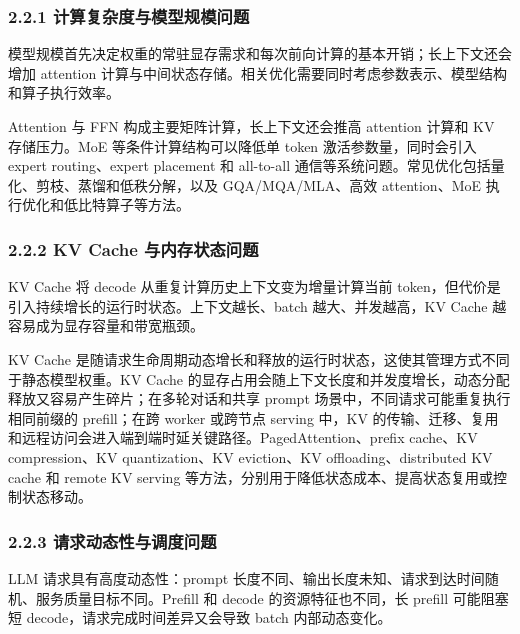 \subsubsection*{2.2.1 计算复杂度与模型规模问题}

模型规模首先决定权重的常驻显存需求和每次前向计算的基本开销；长上下文还会增加 attention 计算与中间状态存储。相关优化需要同时考虑参数表示、模型结构和算子执行效率。

Attention 与 FFN 构成主要矩阵计算，长上下文还会推高 attention 计算和 KV 存储压力。MoE 等条件计算结构可以降低单 token 激活参数量，同时会引入 expert routing、expert placement 和 all-to-all 通信等系统问题。常见优化包括量化、剪枝、蒸馏和低秩分解，以及 GQA/MQA/MLA、高效 attention、MoE 执行优化和低比特算子等方法。




\subsubsection*{2.2.2 KV Cache 与内存状态问题}

KV Cache 将 decode 从重复计算历史上下文变为增量计算当前 token，但代价是引入持续增长的运行时状态。上下文越长、batch 越大、并发越高，KV Cache 越容易成为显存容量和带宽瓶颈。

KV Cache 是随请求生命周期动态增长和释放的运行时状态，这使其管理方式不同于静态模型权重。KV Cache 的显存占用会随上下文长度和并发度增长，动态分配释放又容易产生碎片；在多轮对话和共享 prompt 场景中，不同请求可能重复执行相同前缀的 prefill；在跨 worker 或跨节点 serving 中，KV 的传输、迁移、复用和远程访问会进入端到端时延关键路径。PagedAttention、prefix cache、KV compression、KV quantization、KV eviction、KV offloading、distributed KV cache 和 remote KV serving 等方法，分别用于降低状态成本、提高状态复用或控制状态移动。




\subsubsection*{2.2.3 请求动态性与调度问题}

LLM 请求具有高度动态性：prompt 长度不同、输出长度未知、请求到达时间随机、服务质量目标不同。Prefill 和 decode 的资源特征也不同，长 prefill 可能阻塞短 decode，请求完成时间差异又会导致 batch 内部动态变化。

